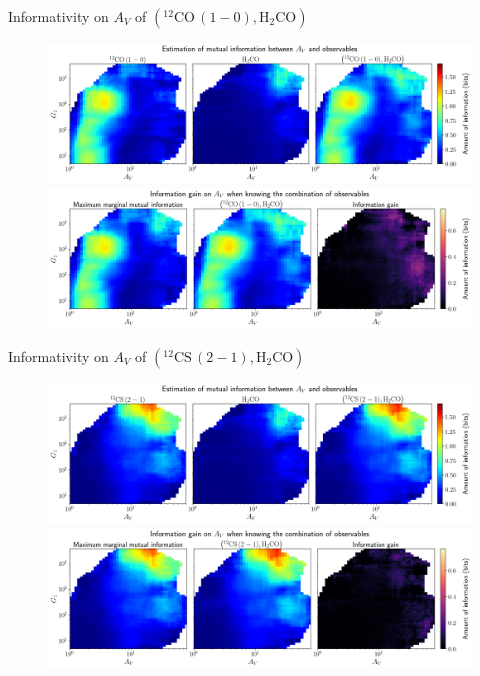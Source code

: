 \documentclass{beamer}
\begin{document}
\begin{frame}{Informativity on $A_V$ of $\left(\mathrm{^{12}CO\,(1-0)},\mathrm{H_2CO}\right)$}
    \begin{figure}
        \centering
        \includegraphics[width=0.95\linewidth]{../mi/av__12co10_h2co_mi.png}
        \vfill
        \includegraphics[width=0.95\linewidth]{../mi/av__12co10_h2co_mi_gain.png}
    \end{figure}
\end{frame}

\begin{frame}{Informativity on $A_V$ of $\left(\mathrm{^{12}CS\,(2-1)},\mathrm{H_2CO}\right)$}
    \begin{figure}
        \centering
        \includegraphics[width=0.95\linewidth]{../mi/av__12cs21_h2co_mi.png}
        \vfill
        \includegraphics[width=0.95\linewidth]{../mi/av__12cs21_h2co_mi_gain.png}
    \end{figure}
\end{frame}
\end{document}
